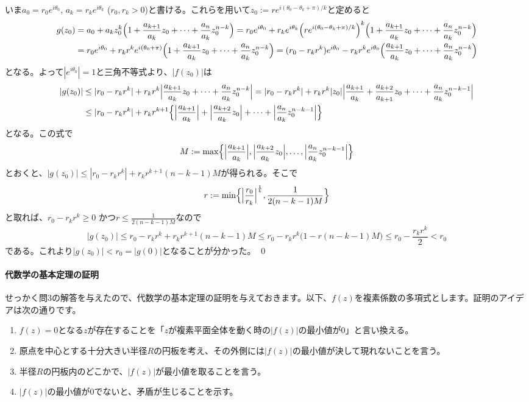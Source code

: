 いま$a_0 = r_0 e^{i\theta_0}$, $a_k = r_k e^{i\theta_k}$ ($r_0,r_k > 0$)と書ける。これらを用いて$z_0:=re^{i(\theta_0-\theta_k+\pi)/k}$と定めると
\begin{align*}
g(z_0) &= a_0 + a_k z_0^k \Bigl( 1 + \frac{a_{k+1}}{a_k} z_0 + \cdots + \frac{a_n}{a_k} z_0^{n-k}\Bigr)
= r_0e^{i\theta_0} + r_k e^{i\theta_k} \Bigl(re^{i(\theta_0-\theta_k+\pi)/k}\Bigr)^k \Bigl( 1 + \frac{a_{k+1}}{a_k} z_0 + \cdots + \frac{a_n}{a_k} z_0^{n-k}\Bigr)\\
&= r_0e^{i\theta_0} + r_k r^k e^{i(\theta_0+\pi)} \Bigl( 1 + \frac{a_{k+1}}{a_k} z_0 + \cdots + \frac{a_n}{a_k} z_0^{n-k}\Bigr)
= (r_0-r_kr^k) e^{i\theta_0} - r_k r^k e^{i\theta_0} \Bigl( \frac{a_{k+1}}{a_k} z_0 + \cdots + \frac{a_n}{a_k} z_0^{n-k}\Bigr)
\end{align*}
となる。よって$|e^{i\theta_0}|=1$と三角不等式より、$|f(z_0)|$は
\begin{align*}
|g(z_0)| &\leq |r_0-r_k r^k | + r_k r^k \Bigl| \frac{a_{k+1}}{a_k} z_0 + \cdots + \frac{a_n}{a_k} z_0^{n-k}\Bigr|
= |r_0-r_k r^k| + r_k r^k|z_0| \Bigl| \frac{a_{k+1}}{a_k} + \frac{a_{k+2}}{a_{k+1}}z_0  + \cdots + \frac{a_n}{a_k} z_0^{n-k-1}\Bigr| \\
&\leq |r_0-r_k r^k| + r_k r^{k+1}\Bigl\{\Bigl|\frac{a_{k+1}}{a_k}\Bigr| + \Bigl|\frac{a_{k+2}}{a_k} z_0\Bigr| + \cdots + \Bigl|\frac{a_{n}}{a_k} z_0^{n-k-1}\Bigr|\Bigr\}
\end{align*}
となる。この式で
\[
M := \max\Bigl\{\Bigl|\frac{a_{k+1}}{a_k}\Bigr|, \Bigl|\frac{a_{k+2}}{a_k} z_0\Bigr|, \ldots, \Bigl|\frac{a_{n}}{a_k} z_0^{n-k-1}\Bigr|\Bigr\}
\]
とおくと、$|g(z_0)|\leq |r_0-r_kr^k| + r_k r^{k+1}(n-k-1)M$が得られる。そこで
\[
r := \min\Bigl\{\Bigl|\frac{r_0}{r_k}\Bigr|^{\frac{1}{k}} , \frac{1}{2(n-k-1)M}\Bigr\}
\]
と取れば、$ r_0-r_k r^k \geq 0 $ かつ$ r \leq \frac{1}{2(n-k-1)M} $なので
\[
|g(z_0)|\leq r_0 - r_k r^k + r_k r^{k+1}(n-k-1)M \leq r_0 - r_k r^k \bigl( 1 - r(n-k-1)M\bigr)
\leq r_0 - \frac{r_k r^k}{2} < r_0
\]
である。これより$|g(z_0)|<r_0=|g(0)|$となることが分かった。 \qed


\paragraph{代数学の基本定理の証明}

せっかく問$3$の解答を与えたので、代数学の基本定理の証明を与えておきます。以下、$f(z)$を複素係数の多項式とします。証明のアイデアは次の通りです。
\begin{enumerate}
\item $f(z)=0$となる$z$が存在することを「$z$が複素平面全体を動く時の$|f(z)|$の最小値が$0$」と言い換える。
\item 原点を中心とする十分大きい半径$R$の円板を考え、その外側には$|f(z)|$の最小値が決して現れないことを言う。
\item 半径$R$の円板内のどこかで、$|f(z)|$が最小値を取ることを言う。
\item $|f(z)|$の最小値が$0$でないと、矛盾が生じることを示す。
\end{enumerate}


